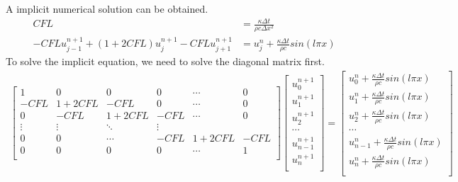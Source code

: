 \documentclass[a4paper]{article}
\begin{document}
        A implicit numerical solution can be obtained.
        \begin{align*}
            CFL &= \frac{\kappa \Delta t}{\rho c \Delta x^2} \\
            -CFL u^{n+1}_{j-1} + (1+2CFL)u^{n+1}_j - CFL u^{n+1}_{j+1} &= u^n_j + \frac{\kappa \Delta t}{\rho c}sin(l \pi x)
        \end{align*}
        To solve the implicit equation, we need to solve the diagonal matrix first.
        \begin{align*}
            \left[
                \begin{matrix}
                    1        & 0           & 0       & 0        & \cdots   & 0      \\
                    -CFL     & 1+2CFL      & -CFL    & 0        &\cdots    & 0      \\
                    0        & -CFL        & 1+2CFL  & -CFL     &\cdots    & 0      \\
                    \vdots & \vdots & \ddots & \vdots \\
                    0        & 0           &\cdots   & -CFL     & 1+2CFL   & -CFL   \\
                    0        & 0           & 0       & 0        & \cdots   & 1      \\
                \end{matrix}
            \right]
            \left[
                \begin{matrix}
                    u^{n+1}_0 \\ u^{n+1}_1 \\ u^{n+1}_2 \\ \cdots \\ u^{n+1}_{n-1} \\ u^{n+1}_n \\           
                \end{matrix}
            \right]
            =
            \left[
                \begin{matrix}
                    u^{n}_0 + \frac{\kappa \Delta t}{\rho c}sin(l \pi x) \\ 
                    u^{n}_1 + \frac{\kappa \Delta t}{\rho c}sin(l \pi x) \\ 
                    u^{n}_2 + \frac{\kappa \Delta t}{\rho c}sin(l \pi x) \\
                    \cdots \\ 
                    u^{n}_{n-1} + \frac{\kappa \Delta t}{\rho c}sin(l \pi x) \\ 
                    u^{n}_n + \frac{\kappa \Delta t}{\rho c}sin(l \pi x) \\           
                \end{matrix}
            \right]
        \end{align*}
\end{document}
